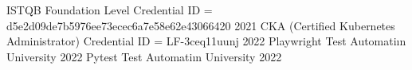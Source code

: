 


\begin{cvhonors}

  \cvhonor
    {ISTQB Foundation Level} %
    {Credential ID = d5e2d09de7b5976ee73ecec6a7e58e62e43066420}%
    {} %
    {2021} %
  \cvhonor
    {CKA (Certified Kubernetes Administrator)} %
    {Credential ID = LF-3ceq11uunj} %
    {} %
    {2022} %
  \cvhonor
    {Playwright} %
    {Test Automatiın University} %
    {} %
    {2022} %
  \cvhonor
    {Pytest} %
    {Test Automatiın University} %
    {} %
    {2022} %
\end{cvhonors}